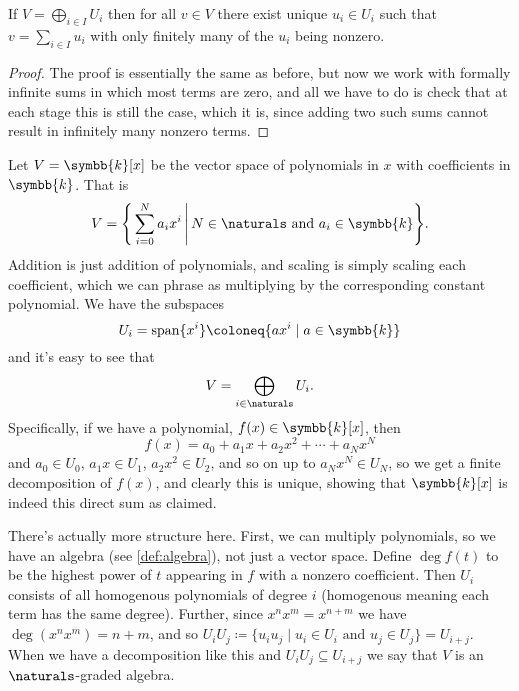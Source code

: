 \documentclass[fleqn]{NotesClass}
\renewcommand{\field}{\symbb{k}}
\DeclareMathOperator{\Span}{span}
\begin{document}
    \begin{lma}{}{}
        If \(V = \bigoplus_{i \in I} U_i\) then for all \(v \in V\) there exist unique \(u_i \in U_i\) such that \(v = \sum_{i \in I} u_i\) with only finitely many of the \(u_i\) being nonzero.
        \begin{proof}
            The proof is essentially the same as before, but now we work with formally infinite sums in which most terms are zero, and all we have to do is check that at each stage this is still the case, which it is, since adding two such sums cannot result in infinitely many nonzero terms.
        \end{proof}
    \end{lma}
    
    \begin{exm}{}{}
        Let \(V = \field[x]\) be the vector space of polynomials in \(x\) with coefficients in \(\field\).
        That is
        \begin{equation}
            V = \Bigg\{ \sum_{i = 0}^N a_i x^i \,\Bigg\vert\, N \in \naturals \text{ and } a_i \in \field \Bigg\}.
        \end{equation}
        Addition is just addition of polynomials, and scaling is simply scaling each coefficient, which we can phrase as multiplying by the corresponding constant polynomial.
        We have the subspaces
        \begin{equation}
            U_i = \Span \{x^i\} \coloneq \{a x^i \mid a \in \field\}
        \end{equation}
        and it's easy to see that
        \begin{equation}
            V = \bigoplus_{i \in \naturals} U_i.
        \end{equation}
        Specifically, if we have a polynomial, \(f(x) \in \field[x]\), then
        \begin{equation}
            f(x) = a_0 + a_1x + a_2 x^2 + \dotsb + a_N x^N
        \end{equation}
        and \(a_0 \in U_0\), \(a_1 x \in U_1\), \(a_2 x^2 \in U_2\), and so on up to \(a_N x^N \in U_N\), so  we get a finite decomposition of \(f(x)\), and clearly this is unique, showing that \(\field[x]\) is indeed this direct sum as claimed.
        
        \begin{rmk}
            There's actually more structure here.
            First, we can multiply polynomials, so we have an algebra (see \cref{def:algebra}), not just a vector space.
            Define \(\deg f(t)\) to be the highest power of \(t\) appearing in \(f\) with a nonzero coefficient.
            Then \(U_i\) consists of all homogenous polynomials of degree \(i\) (homogenous meaning each term has the same degree).
            Further, since \(x^n x^m = x^{n + m}\) we have \(\deg (x^n x^m) = n + m\), and so \(U_iU_j \coloneq \{u_i u_j \mid u_i \in U_i \text{ and } u_j \in U_j\} = U_{i + j}\).
            When we have a decomposition like this and \(U_i U_j \subseteq U_{i + j}\) we say that \(V\) is an \(\naturals\)-graded algebra.
        \end{rmk}
    \end{exm}
    
\end{document}

